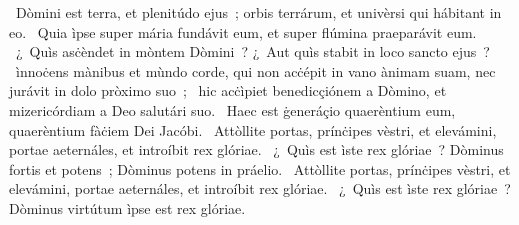 ~Dòmini est terra, et plenitúdo ejus~; orbis terrárum, et univèrsi qui hábitant in eo. 
~Quia ìpse super mária fundávit eum, et super flúmina praeparávit eum. 
~¿~Quìs asċèndet in mòntem Dòmini~? ¿~Aut quìs stabit in loco sancto ejus~? 
~ìnnoċens mànibus et mùndo corde, qui non acċépit in vano ànimam suam, nec jurávit in dolo pròximo suo~; 
~hic acċìpiet benedicçiónem a Dòmino, et mizericórdiam a Deo salutári suo. 
~Haec est ġeneráçio quaerèntium eum, quaerèntium fàċiem Dei Jacóbi. 
~Attòllite portas, prínċipes vèstri, et elevámini, portae aeternáles, et introíbit rex glóriae. 
~¿~Quìs est ìste rex glóriae~? Dòminus fortis et potens~; Dòminus potens in práelio. 
~Attòllite portas, prínċipes vèstri, et elevámini, portae aeternáles, et introíbit rex glóriae. 
~¿~Quìs est ìste rex glóriae~? Dòminus virtútum ìpse est rex glóriae. 
